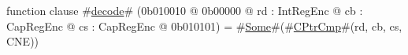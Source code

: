function clause #\hyperref[zdecode]{decode}# (0b010010 @ 0b00000 @ rd : IntRegEnc @ cb : CapRegEnc @ cs : CapRegEnc @ 0b010101) = #\hyperref[zSome]{Some}#(#\hyperref[zCPtrCmp]{CPtrCmp}#(rd, cb, cs, CNE))
